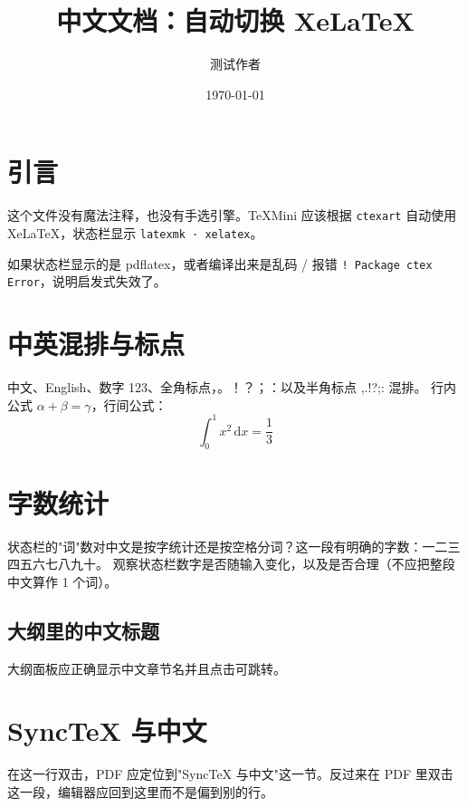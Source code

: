 \documentclass[UTF8,12pt]{ctexart}
\title{中文文档：自动切换 XeLaTeX}
\author{测试作者}
\date{\today}
\begin{document}
\maketitle

\section{引言}
这个文件没有魔法注释，也没有手选引擎。TeXMini 应该根据 \verb|ctexart| 自动使用 XeLaTeX，状态栏显示 \texttt{latexmk · xelatex}。

如果状态栏显示的是 pdflatex，或者编译出来是乱码 / 报错 \verb|! Package ctex Error|，说明启发式失效了。

\section{中英混排与标点}
中文、English、数字 123、全角标点，。！？；：以及半角标点 ,.!?;: 混排。
行内公式 $\alpha + \beta = \gamma$，行间公式：
\begin{equation}
  \int_0^1 x^2 \,\mathrm{d}x = \frac{1}{3}
\end{equation}

\section{字数统计}
状态栏的"词"数对中文是按字统计还是按空格分词？这一段有明确的字数：一二三四五六七八九十。
观察状态栏数字是否随输入变化，以及是否合理（不应把整段中文算作 1 个词）。

\subsection{大纲里的中文标题}
大纲面板应正确显示中文章节名并且点击可跳转。

\section{SyncTeX 与中文}
在这一行双击，PDF 应定位到"SyncTeX 与中文"这一节。反过来在 PDF 里双击这一段，编辑器应回到这里而不是偏到别的行。
\end{document}
